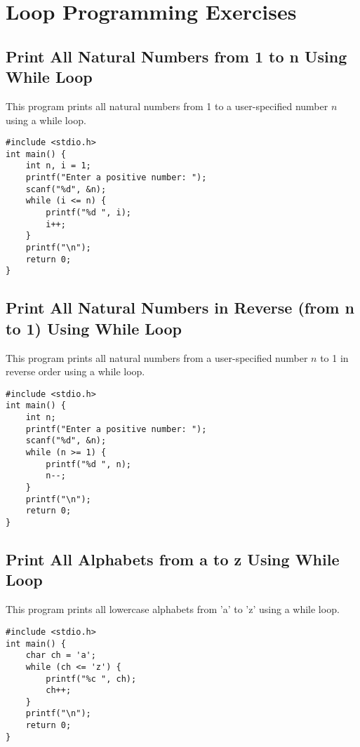 \documentclass[a4paper,12pt]{article}
\begin{document}
\newpage

\section{Loop Programming Exercises}

\subsection{Print All Natural Numbers from 1 to n Using While Loop}
This program prints all natural numbers from 1 to a user-specified number \(n\) using a while loop.

\begin{lstlisting}[caption={Print All Natural Numbers from 1 to n Using While Loop}]
#include <stdio.h>
int main() {
    int n, i = 1;
    printf("Enter a positive number: ");
    scanf("%d", &n);
    while (i <= n) {
        printf("%d ", i);
        i++;
    }
    printf("\n");
    return 0;
}
\end{lstlisting}

\newpage

\subsection{Print All Natural Numbers in Reverse (from n to 1) Using While Loop}
This program prints all natural numbers from a user-specified number \(n\) to 1 in reverse order using a while loop.

\begin{lstlisting}[caption={Print All Natural Numbers in Reverse (from n to 1) Using While Loop}]
#include <stdio.h>
int main() {
    int n;
    printf("Enter a positive number: ");
    scanf("%d", &n);
    while (n >= 1) {
        printf("%d ", n);
        n--;
    }
    printf("\n");
    return 0;
}
\end{lstlisting}

\newpage

\subsection{Print All Alphabets from a to z Using While Loop}
This program prints all lowercase alphabets from 'a' to 'z' using a while loop.

\begin{lstlisting}[caption={Print All Alphabets from a to z Using While Loop}]
#include <stdio.h>
int main() {
    char ch = 'a';
    while (ch <= 'z') {
        printf("%c ", ch);
        ch++;
    }
    printf("\n");
    return 0;
}
\end{lstlisting}
\end{document}
